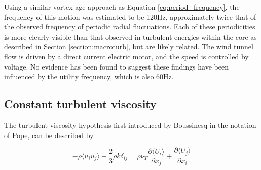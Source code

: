 










\makeatletter
{}
\makeatother


Using a similar vortex age approach as Equation \ref{eq:period_frequency}, the 
frequency of this motion was estimated to be 120Hz, approximately twice that of 
the observed frequency of periodic radial fluctuations. Each of these 
periodicities is more clearly visible than that observed in turbulent energies 
within the core as described in Section \ref{section:macroturb}, but are likely 
related. The wind tunnel flow is driven by a direct current electric motor, and 
the speed is controlled by voltage. No evidence has been found to suggest these 
findings have been influenced by the utility frequency, which is also 60Hz.

\subsection{Constant turbulent viscosity}
The turbulent viscosity hypothesis first introduced by 
Boussinesq \cite{pope2000} in the notation of Pope, can be described by

\begin{equation}
-\rho \langle u_i u_j \rangle + \frac{2}{3}\rho k \delta_{ij} = \rho \nu_T
\frac{\partial \langle U_i \rangle}{\partial x_j} + \frac{\partial \langle U_j 
\rangle}{\partial x_i}
\end{equation} 


